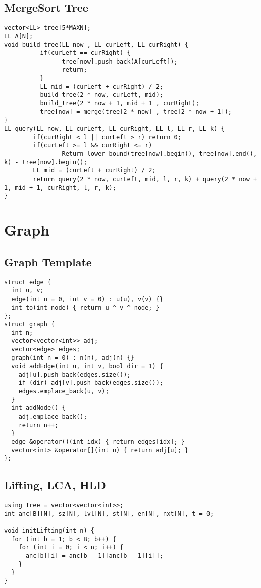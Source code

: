 \documentclass[FSZ,a4paper,onesided]{article}
\begin{document}
\begin{multicols*}{\COLS}
\subsection{MergeSort Tree}
\begin{lstlisting}
vector<LL> tree[5*MAXN];
LL A[N];
void build_tree(LL now , LL curLeft, LL curRight) {
          if(curLeft == curRight) {
                tree[now].push_back(A[curLeft]);
                return;
          }
          LL mid = (curLeft + curRight) / 2;
          build_tree(2 * now, curLeft, mid);
          build_tree(2 * now + 1, mid + 1 , curRight);
          tree[now] = merge(tree[2 * now] , tree[2 * now + 1]);
}
LL query(LL now, LL curLeft, LL curRight, LL l, LL r, LL k) {
        if(curRight < l || curLeft > r) return 0;
        if(curLeft >= l && curRight <= r)
                Return lower_bound(tree[now].begin(), tree[now].end(), k) - tree[now].begin();
        LL mid = (curLeft + curRight) / 2;
        return query(2 * now, curLeft, mid, l, r, k) + query(2 * now + 1, mid + 1, curRight, l, r, k);
}\end{lstlisting}
\section{Graph}
\subsection{Graph Template}
\begin{lstlisting}
struct edge {
  int u, v;
  edge(int u = 0, int v = 0) : u(u), v(v) {}
  int to(int node) { return u ^ v ^ node; }
};
struct graph {
  int n;
  vector<vector<int>> adj;
  vector<edge> edges;
  graph(int n = 0) : n(n), adj(n) {}
  void addEdge(int u, int v, bool dir = 1) {
    adj[u].push_back(edges.size());
    if (dir) adj[v].push_back(edges.size());
    edges.emplace_back(u, v);
  }
  int addNode() {
    adj.emplace_back();
    return n++;
  }
  edge &operator()(int idx) { return edges[idx]; }
  vector<int> &operator[](int u) { return adj[u]; }
};
\end{lstlisting}
\subsection{Lifting, LCA, HLD}
\begin{lstlisting}
using Tree = vector<vector<int>>;
int anc[B][N], sz[N], lvl[N], st[N], en[N], nxt[N], t = 0;

void initLifting(int n) {
  for (int b = 1; b < B; b++) {
    for (int i = 0; i < n; i++) {
      anc[b][i] = anc[b - 1][anc[b - 1][i]];
    }
  }
}


\end{lstlisting}
\end{multicols*}
\end{document}
